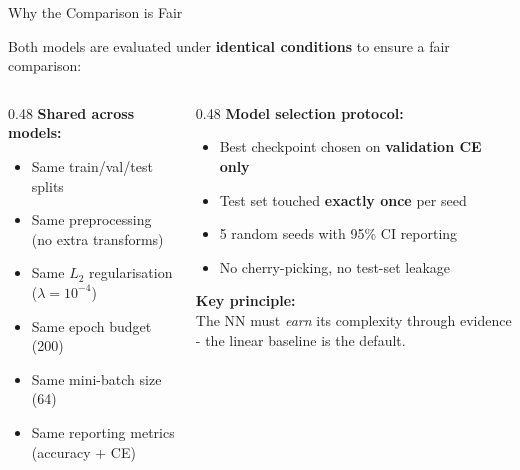 \documentclass[11pt,aspectratio=169]{beamer}
\begin{document}
\begin{frame}{Why the Comparison is Fair}

Both models are evaluated under \textbf{identical conditions} to ensure a fair comparison:

\vspace{0.5em}
\begin{columns}[T]
\begin{column}{0.48\textwidth}
\textbf{Shared across models:}
\begin{itemize}
    \item Same train/val/test splits
    \item Same preprocessing (no extra transforms)
    \item Same $L_2$ regularisation ($\lambda = 10^{-4}$)
    \item Same epoch budget (200)
    \item Same mini-batch size (64)
    \item Same reporting metrics (accuracy + CE)
\end{itemize}
\end{column}
\begin{column}{0.48\textwidth}
\textbf{Model selection protocol:}
\begin{itemize}
    \item Best checkpoint chosen on \textbf{validation CE only}
    \item Test set touched \textbf{exactly once} per seed
    \item 5 random seeds with 95\% CI reporting
    \item[$\Rightarrow$] No cherry-picking, no test-set leakage
\end{itemize}

\vspace{0.4em}
\textbf{Key principle:}\\
The NN must \textit{earn} its complexity through evidence - the linear baseline is the default.
\end{column}
\end{columns}

\end{frame}
\end{document}

